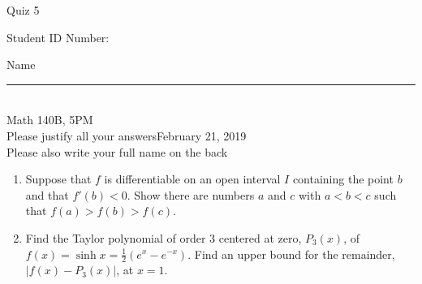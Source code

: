 \documentclass[12pt]{article}
\begin{document}
\begin{flushleft} 
\centerline{\LARGE{Quiz 5}} 
\vspace{5 mm}
{Student ID Number:}\hfill  
{Name \rule {2 in}{0.01in}}\\
Math 140B, 5PM
\\
{Please justify all your answers}\hfill {February 21, 2019}
\\
{Please also write your full name on the back} 

\medskip
\end{flushleft}

\begin{enumerate}
	\item Suppose that $f$ is differentiable on an open interval $I$ containing the point $b$ and that $f'(b)<0$. Show there are numbers $a$ and $c$ with $a<b<c$ such that $f(a)>f(b)>f(c)$.
	\vfill
	\item Find the Taylor polynomial of order 3 centered at zero, $P_3(x)$, of $f(x) = \sinh x = \frac{1}{2}(e^{x}-e^{-x})$. Find an upper bound for the remainder, $|f(x)-P_3(x)|$, at $x = 1$.
	\vfill
\end{enumerate}

\end{document}
